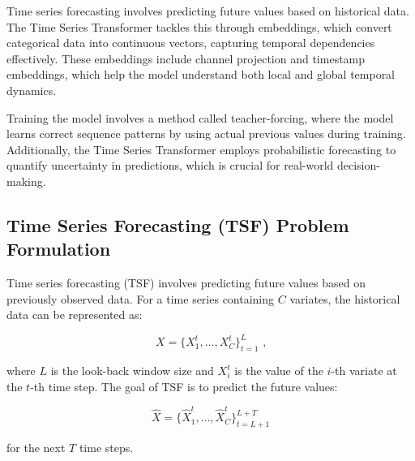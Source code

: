 Time series forecasting involves predicting future values based on historical data. The Time Series Transformer tackles this through embeddings, which convert categorical data into continuous vectors, capturing temporal dependencies effectively. These embeddings include channel projection and timestamp embeddings, which help the model understand both local and global temporal dynamics.

Training the model involves a method called teacher-forcing, where the model learns correct sequence patterns by using actual previous values during training. Additionally, the Time Series Transformer employs probabilistic forecasting to quantify uncertainty in predictions, which is crucial for real-world decision-making.

\subsection{Time Series Forecasting (TSF) Problem Formulation}
Time series forecasting (TSF) involves predicting future values based on previously observed data. For a time series containing \(C\) variates, the historical data can be represented as:

\begin{equation}
X = \{X^t_1, \ldots, X^t_C\}_{t=1}^L \text{ ,}
\end{equation}

where \(L\) is the look-back window size and \(X^t_i\) is the value of the \(i\)-th variate at the \(t\)-th time step. The goal of TSF is to predict the future values:

\begin{equation}
\hat{X} = \{\hat{X}^t_1, \ldots, \hat{X}^t_C\}_{t=L+1}^{L+T}
\end{equation}

for the next \(T\) time steps.

